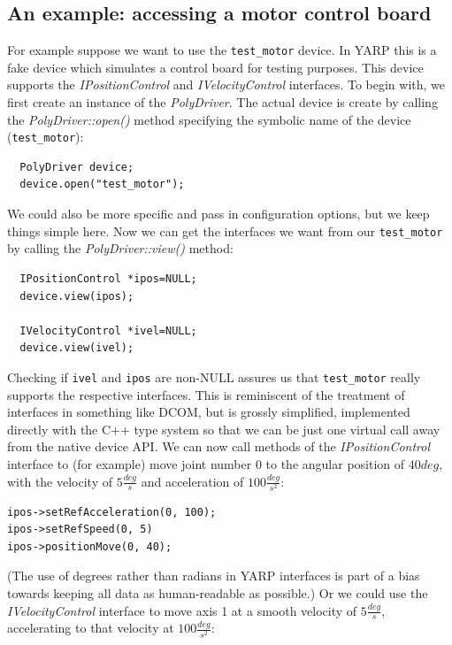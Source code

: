 \subsection{An example: accessing a motor control board}
For example suppose we want to use the {\tt test\_motor} device. In 
YARP this is a fake device which simulates a control board for
testing purposes. This device supports the \emph{IPositionControl} and 
\emph{IVelocityControl} interfaces. To begin with, we first create an 
instance of the \emph{PolyDriver}. The actual device is create by 
calling the \emph{PolyDriver::open()} method specifying the symbolic 
name of the device ({\tt test\_motor}):

\begin{verbatim}
  PolyDriver device;
  device.open("test_motor");
\end{verbatim}

We could also be more specific and pass in configuration options,
but we keep things simple here.
Now we can get the interfaces we want from our {\tt test\_motor} 
by calling the \emph{PolyDriver::view()} method:

\begin{verbatim}
  IPositionControl *ipos=NULL;
  device.view(ipos);

  IVelocityControl *ivel=NULL;
  device.view(ivel);
\end{verbatim}

Checking if {\tt ivel} and {\tt ipos} are non-NULL assures us that 
{\tt test\_motor} really supports the respective interfaces.
This is reminiscent of the treatment of interfaces
in something like DCOM, but is grossly simplified,
implemented directly with the C++ type system so
that we can be just one virtual call away from
the native device API.
%
We can now call methods of the \emph{IPositionControl} interface to 
(for example) move 
joint number $0$ to the angular position of $40deg$, with the velocity 
of $5\frac{deg}{s}$ and acceleration of $100\frac{deg}{s^2}$:

\begin{verbatim}
ipos->setRefAcceleration(0, 100);
ipos->setRefSpeed(0, 5)
ipos->positionMove(0, 40);
\end{verbatim}

%
(The use of degrees rather than radians in YARP interfaces
is part of a bias towards keeping all data as human-readable
as possible.)
%
Or we could use the \emph{IVelocityControl} interface to move axis 1
at a smooth velocity of $5\frac{deg}{s}$, accelerating to
that velocity at $100\frac{deg}{s^2}$:

